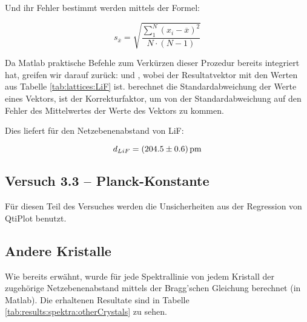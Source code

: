 Und ihr Fehler bestimmt werden mittels der Formel:

\begin{equation*}
    s_{\overline{x}} = \sqrt{ \frac{\sum_{1}^{N}{(x_i-\overline{x})^2}}{N \cdot (N-1)}}
\end{equation*}

Da  Matlab   praktische  Befehle  zum  Verk\"urzen   dieser  Prozedur  bereits
integriert hat,  greifen wir darauf zur\"uck:   und ,  wobei    der  Resultatvektor  mit  den  Werten
aus  Tabelle  \ref{tab:lattices:LiF}  ist.    berechnet  die
Standardabweichung der  Werte eines  Vektors,   ist der
Korrekturfaktor, um von der Standardabweichung auf den Fehler des Mittelwertes
der Werte des Vektors zu kommen.


Dies liefert f\"ur den Netzebenenabstand von LiF:

\begin{equation*}
    d_{LiF} = \SI{204.5 \pm 0.6}{\pico\meter}
\end{equation*}


\subsection{Versuch 3.3 -- Planck-Konstante}
\label{subsec:error:planck}

F\"ur diesen Teil  des Versuches werden die Unsicherheiten  aus der Regression
von QtiPlot benutzt.

\subsection{Andere Kristalle}
\label{subsec:error:othercrystals}


Wie   bereits   erw\"ahnt,   wurde   f\"ur  jede   Spektrallinie   von   jedem
Kristall   der   zugeh\"orige   Netzebenenabstand  mittels   der   Bragg'schen
Gleichung  berechnet (in  Matlab). Die  erhaltenen Resultate  sind in  Tabelle
\ref{tab:results:spektra:otherCrystals} zu sehen.

